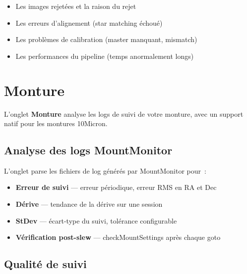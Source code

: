 \documentclass[a4paper,11pt]{article}
\begin{document}
\begin{itemize}
    \item Les images rejet\'{e}es et la raison du rejet
    \item Les erreurs d'alignement (star matching \'{e}chou\'{e})
    \item Les probl\`{e}mes de calibration (master manquant, mismatch)
    \item Les performances du pipeline (temps anormalement longs)
\end{itemize}


\section{Monture}
\label{sec:monture}

\begin{tcolorbox}[
    enhanced, colback=successgreen!8, colframe=successgreen!60,
    coltitle=white, fonttitle=\bfseries,
    title={NOUVEAU dans v1.2.0}
]
L'onglet \textbf{Monture} analyse les logs de suivi de votre monture, avec un support natif pour les montures 10Micron.
\end{tcolorbox}

\subsection{Analyse des logs MountMonitor}

L'onglet parse les fichiers de log g\'{e}n\'{e}r\'{e}s par MountMonitor pour~:

\begin{itemize}
    \item \textbf{Erreur de suivi} --- erreur p\'{e}riodique, erreur RMS en RA et Dec
    \item \textbf{D\'{e}rive} --- tendance de la d\'{e}rive sur une session
    \item \textbf{StDev} --- \'{e}cart-type du suivi, tol\'{e}rance configurable
    \item \textbf{V\'{e}rification post-slew} --- checkMountSettings apr\`{e}s chaque goto
\end{itemize}

\subsection{Qualit\'{e} de suivi}
\end{document}
